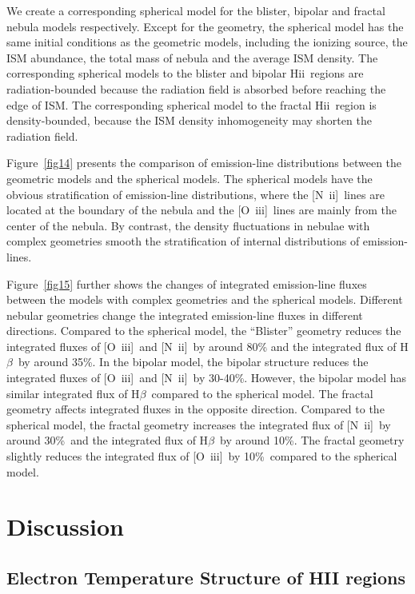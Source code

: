 \documentclass[twocolumn]{aastex62}
\newcommand{\hb}{H$\beta$}    %
\newcommand{\oiii}{[O~{\sc iii}]}
\newcommand{\nii}{[N~{\sc ii}]}
\newcommand{\hiireg}{{H{\sc ii}}}
\begin{document}
\begin{CJK*}{UTF8}{gbsn}
We create a corresponding spherical model for the blister, bipolar and fractal nebula models respectively.
Except for the geometry, the spherical model has the same initial conditions as the geometric models, including the ionizing source, the ISM abundance, the total mass of nebula and the average ISM density.
The corresponding spherical models to the blister and bipolar \hiireg\ regions are radiation-bounded because the radiation field is absorbed before reaching the edge of ISM.
The corresponding spherical model to the fractal \hiireg\ region is density-bounded, because the ISM density inhomogeneity may shorten the radiation field. 

Figure~\ref{fig14} presents the comparison of emission-line distributions between the geometric models and the spherical models.
The spherical models have the obvious stratification of emission-line distributions, where the \nii\ lines are located at the boundary of the nebula and the \oiii\ lines are mainly from the center of the nebula.
By contrast, the density fluctuations in nebulae with complex geometries smooth the stratification of internal distributions of emission-lines.

Figure~\ref{fig15} further shows the changes of integrated emission-line fluxes between the models with complex geometries and the spherical models.
Different nebular geometries change the integrated emission-line fluxes in different directions.
Compared to the spherical model, the ``Blister'' geometry reduces the integrated fluxes of \oiii\ and \nii\ by around 80\% and the integrated flux of \hb\ by around 35\%.
In the bipolar model, the bipolar structure reduces the integrated fluxes of \oiii\ and \nii\ by 30-40\%. 
However, the bipolar model has similar integrated flux of \hb\ compared to the spherical model.
The fractal geometry affects integrated fluxes in the opposite direction.
Compared to the spherical model, the fractal geometry increases the integrated flux of \nii\ by around 30\%\ and the integrated flux of \hb\ by around 10\%. 
The fractal geometry slightly reduces the integrated flux of \oiii\ by 10\%\ compared to the spherical model.

\section{Discussion}\label{sec:discussion}

\subsection{Electron Temperature Structure of HII regions}


\end{CJK*}
\end{document}
